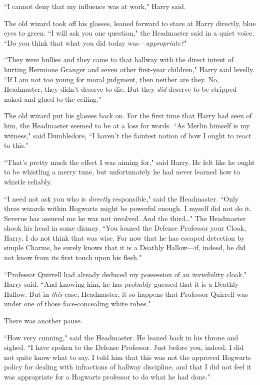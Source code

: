 ``I cannot deny that my influence was at work," Harry said.

The old wizard took off his glasses, leaned forward to stare at Harry directly, blue eyes to green. ``I will ask you one question," the Headmaster said in a quiet voice. ``Do you think that what you did today was—\emph{appropriate?}"

``They were bullies and they came to that hallway with the direct intent of hurting Hermione Granger and seven other first-year children," Harry said levelly. ``If I am not too young for moral judgment, then neither are they. No, Headmaster, they didn't deserve to die. But they \emph{did} deserve to be stripped naked and glued to the ceiling."

The old wizard put his glasses back on. For the first time that Harry had seen of him, the Headmaster seemed to be at a loss for words. ``As Merlin himself is my witness," said Dumbledore, ``I haven't the faintest notion of how I ought to react to this."

``That's pretty much the effect I was aiming for," said Harry. He felt like he ought to be whistling a merry tune, but unfortunately he had never learned how to whistle reliably.

``I need not ask you who is \emph{directly} responsible," said the Headmaster. ``Only three wizards within Hogwarts might be powerful enough. I myself did not do it. Severus has assured me he was not involved. And the third{\ldots}" The Headmaster shook his head in some dismay. ``You loaned the Defense Professor your Cloak, Harry. I do not think that was wise. For now that he has escaped detection by simple Charms, he surely knows that it is a Deathly Hallow—if, indeed, he did not know from its first touch upon his flesh."

``Professor Quirrell had already deduced my possession of an invisibility cloak," Harry said. ``And knowing him, he has probably guessed that it is a Deathly Hallow. But in \emph{this} case, Headmaster, it so happens that Professor Quirrell was under one of those face-concealing white robes."

There was another pause.

``How very cunning," said the Headmaster. He leaned back in his throne and sighed. ``I have spoken to the Defense Professor. Just before you, indeed. I did not quite know what to say. I told him that this was not the approved Hogwarts policy for dealing with infractions of hallway discipline, and that I did not feel it was appropriate for a Hogwarts professor to do what he had done."

